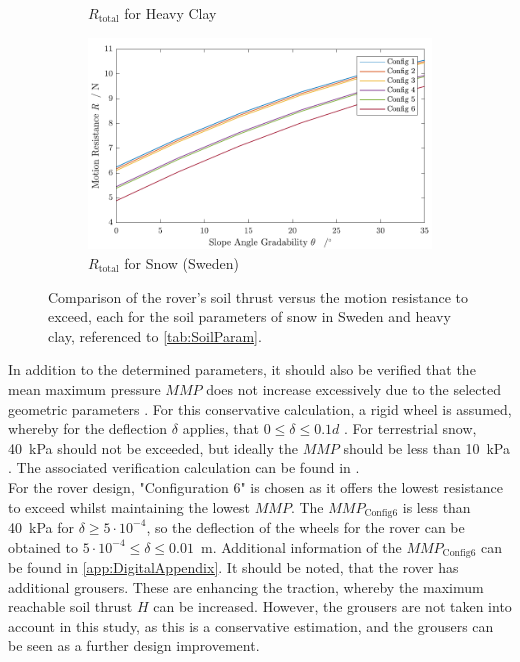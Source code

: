 \begin{figure}[htb]
\begin{subfigure}[b]{0.49\textwidth}
         \caption{\(R_\text{total}\) for Heavy Clay}
         \label{fig:RClay}
     \end{subfigure}
     \hfill
     \begin{subfigure}[b]{0.49\textwidth}
         \centering
         \includegraphics[width=\textwidth]{Media/ResistanceSnow.pdf}
         \caption{\(R_\text{total}\) for Snow (Sweden)}
         \label{fig:RSnow}
     \end{subfigure}
     \caption{Comparison of the rover's soil thrust versus the motion resistance to exceed, each for the soil parameters of snow in Sweden and heavy clay, referenced to \autoref{tab:SoilParam}.}
     \label{fig:SoilThrust_MotionResistance}
\end{figure}

In addition to the determined parameters, it should also be verified that the mean maximum pressure \(MMP\) does not increase excessively due to the selected geometric parameters \cite{MMP}. For this conservative calculation, a rigid wheel is assumed, whereby for the deflection \(\delta\) applies, that \( 0 \leq \delta \leq 0.1 d\) \cite{Parameters}. For terrestrial snow, 40~kPa should not be exceeded, but ideally the \(MMP\) should be less than 10~kPa \cite{Bekker}. The associated verification calculation can be found in . \\ 
For the rover design, "Configuration 6" is chosen as it offers the lowest resistance to exceed whilst maintaining the lowest \(MMP\). The \(MMP_\text{Config6}\) is less than 40~kPa for \(\delta \geq 5\cdot 10^{-4}\), so the deflection of the wheels for the rover can be obtained to \(5\cdot 10^{-4} \leq \delta \leq 0.01\)~m. Additional information of the \(MMP_\text{Config6}\) can be found in \autoref{app:DigitalAppendix}. It should be noted, that the rover has additional grousers. These are enhancing the traction, whereby the maximum reachable soil thrust \(H\) can be increased. However, the grousers are not taken into account in this study, as this is a conservative estimation, and the grousers can be seen as a further design improvement. 

